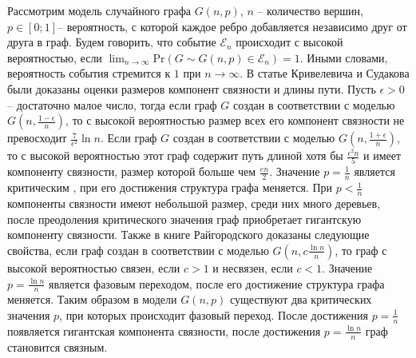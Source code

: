 Рассмотрим модель случайного графа  $G(n,p)$, $n$ -- количество 
вершин,  $p \in [0;1]$-- вероятность, с которой каждое ребро добавляется независимо друг от друга в граф. 
Будем говорить, что событие $\mathcal{E}_{n}$ 
происходит с высокой вероятностью, если $\lim_{n \to \infty} \text{Pr}(G \sim G(n,p) \in \mathcal{E}_{n}) =1 $. Иными
словами, вероятность события стремится к $1$ при $n \to \infty$. В статье Кривелевича и Судакова \cite{ft} были доказаны оценки размеров 
компонент связности и длины пути. Пусть $\epsilon > 0$ -- 
достаточно малое число, тогда если граф  $G$ 
создан в соответствии с моделью  $G\left(n,\frac{1-\epsilon}{n}\right)$,
то с высокой вероятностью размер всех его компонент связности не превосходит 
$\frac{7}{\epsilon^2} \ln{n}$. Если граф $G$ 
создан в соответствии с моделью  $G\left(n,\frac{1+\epsilon}{n}\right)$, то с высокой вероятностью 
этот граф содержит путь длиной хотя бы $\frac{\epsilon^2 n}{5}$ 
и имеет компоненту связности, размер которой больше чем 
$\frac{en}{2}$. Значение $p=\frac{1}{n}$ является критическим , при его достижения
структура графа меняется. При $p< \frac{1}{n}$ компоненты 
связности имеют небольшой размер, среди них много деревьев, 
после преодоления критического значения граф приобретает гигантскую компоненту связности. Также в книге Райгородского
\cite{rai} доказаны следующие свойства, если граф создан 
в соответствии с моделью $G\left(n,c\frac{\ln{n}}{n}\right)$,
то граф с высокой вероятностью связен, если $c > 1$ и несвязен, если $c < 1$. Значение $p = \frac{\ln{n}}{n}$ является фазовым переходом, после его достижение структура графа меняется. Таким 
образом в модели $G(n,p)$ существуют два 
критических значения  $p$, при которых происходит фазовый переход.
После достижения  $p = \frac{1}{n}$ появляется гигантская компонента связности, после достижения $p = \frac{\ln{n}}{n}$ 
граф становится связным.
